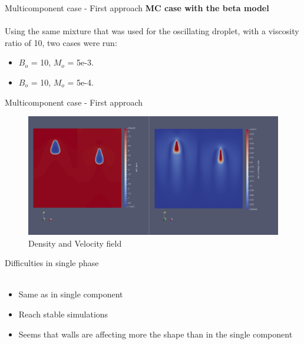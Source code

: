 \documentclass[8pt]{beamer}
\begin{document}
	\begin{frame}{Multicomponent case - First approach}
		\textbf{MC case with the beta model}\\~\\
		Using the same mixture that was used for the oscillating droplet, with a viscosity ratio of 10, two cases were run:
		\begin{itemize}
			\item $B_o$ = 10, $M_o$ = 5e-3.
			\item $B_o$ = 10, $M_o$ = 5e-4.
		\end{itemize}
	\end{frame}
	\begin{frame}{Multicomponent case - First approach}
		\begin{figure}
			\centering
			\includegraphics[scale=0.15]{pics/risingMCComp.png}
			\\{\tiny \justifying Density and Velocity field}
		\end{figure}
	\end{frame}

	\begin{frame}{Difficulties in single phase}
		\textbf{}\\~\\
		\begin{itemize}
			\item Same as in single component
			\item Reach stable simulations
			\item Seems that walls are affecting more the shape than in the single component
		\end{itemize}
	\end{frame}
\end{document}
